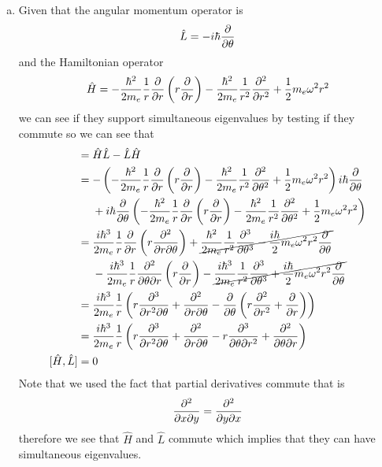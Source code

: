 \documentclass[11pt]{article}
\numberwithin{equation}{section}
\begin{document}
\begin{enumerate}[(a)]
\item
Given that the angular momentum operator is
$$\hat{L} = -i\hbar\frac{\partial{}}{\partial{\theta}}$$
and the Hamiltonian operator 
$$\hat{H} = -\frac{\hbar^2}{2m_e}\frac{1}{r}\frac{\partial{}}{\partial{r}}\left(r\frac{\partial{}}{\partial{r}}\right) - \frac{\hbar^2}{2m_e}\frac{1}{r^2}\frac{\partial{^2}}{\partial{r^2}} + \frac{1}{2}m_e\omega^2r^2$$
we can see if they support simultaneous eigenvalues by testing if they commute so we can see that
\begin{align*}
[\hat{H},\hat{L}] &= \hat{H}\hat{L} - \hat{L}\hat{H}\\
&= -\left(-\frac{\hbar^2}{2m_e}\frac{1}{r}\partiald{}{r}\left(r\partiald{}{r}\right) - \frac{\hbar^2}{2m_e}\frac{1}{r^2}\partiald{^2}{\theta^2} + \frac{1}{2}m_e\omega^2r^2\right)i\hbar\partiald{}{\theta} \\
&\ \ \ \ + i\hbar\partiald{}{\theta}\left(-\frac{\hbar^2}{2m_e}\frac{1}{r}\partiald{}{r}\left(r\partiald{}{r}\right) - \frac{\hbar^2}{2m_e}\frac{1}{r^2}\partiald{^2}{\theta^2} + \frac{1}{2}m_e\omega^2r^2\right)\\
&= \frac{i\hbar^3}{2m_e}\frac{1}{r}\partiald{}{r}\left(r\partiald{^2}{r\partial\theta}\right) + \cancel{\frac{\hbar^2}{2m_e}\frac{1}{r^2}\partiald{^3}{\theta^3} - \frac{i\hbar}{2}m_e\omega^2r^2\partiald{}{\theta}}\\
&\ \ \ \ -\frac{i\hbar^3}{2m_e}\frac{1}{r}\partiald{^2}{\theta\partial r}\left(r\partiald{}{r}\right) - \cancel{\frac{i\hbar^3}{2m_e}\frac{1}{r^2}\partiald{^3}{\theta^3} + \frac{i\hbar}{2}m_e\omega^2r^2\partiald{}{\theta}}\\
&= \frac{i\hbar^3}{2m_e}\frac{1}{r}\left(r\partiald{^3}{r^2\partial\theta} + \partiald{^2}{r\partial\theta} - \partiald{}{\theta}\left(r\partiald{^2}{r^2} + \partiald{}{r}\right)\right)\\
&= \frac{i\hbar^3}{2m_e}\frac{1}{r}\left(r\partiald{^3}{r^2\partial\theta} + \partiald{^2}{r\partial\theta} - r\partiald{^3}{\theta\partial r^2} + \partiald{^2}{\theta\partial r}\right)\\
[\hat{H},\hat{L}] &= 0
\end{align*}
Note that we used the fact that partial derivatives commute that is
$$\frac{\partial{^2}}{\partial{x\partial y}} = \frac{\partial{^2}}{\partial{y\partial x}}$$
therefore we see that $\hat{H}$ and $\hat{L}$ commute which implies that they can have simultaneous eigenvalues.
\end{enumerate}
\end{document}
